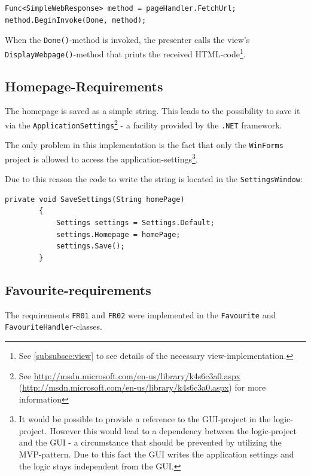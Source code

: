 \begin{lstlisting}[caption=Fetching \ac{URL}s with error-codes]
Func<SimpleWebResponse> method = pageHandler.FetchUrl;
method.BeginInvoke(Done, method);
\end{lstlisting}

When the \texttt{Done()}-method is invoked, the presenter calls the view's \texttt{DisplayWebpage()}-method that prints the received \ac{HTML}-code\footnote{See \autoref{subsubsec:view} to see details of the necessary view-implementation.}.

\subsection{Homepage-Requirements}

The homepage is saved as a simple string. This leads to the possibility to save it via the \texttt{ApplicationSettings}\footnote{See \href{MSDN}{http://msdn.microsoft.com/en-us/library/k4s6c3a0.aspx} (\url{http://msdn.microsoft.com/en-us/library/k4s6c3a0.aspx}) for more information} - a facility provided by the \texttt{.NET} framework.

The only problem in this implementation is the fact that only the \texttt{WinForms} project is allowed to access the application-settings\footnote{It would be possible to provide a reference to the \ac{GUI}-project in the logic-project. However this would lead to a dependency between the logic-project and the \ac{GUI} - a circumstance that should be prevented by utilizing the \ac{MVP}-pattern. Due to this fact the \ac{GUI} writes the application settings and the logic stays independent from the \ac{GUI}.}.

Due to this reason the code to write the string is located in the \texttt{SettingsWindow}:

\begin{lstlisting}[caption=Saving the homepage-settings.]
private void SaveSettings(String homePage)
        {
            Settings settings = Settings.Default;
            settings.Homepage = homePage;
            settings.Save();
        }
\end{lstlisting}

\subsection{Favourite-requirements}

The requirements \texttt{FR01} and \texttt{FR02} were implemented in the \texttt{Favourite} and \texttt{FavouriteHandler}-classes.

